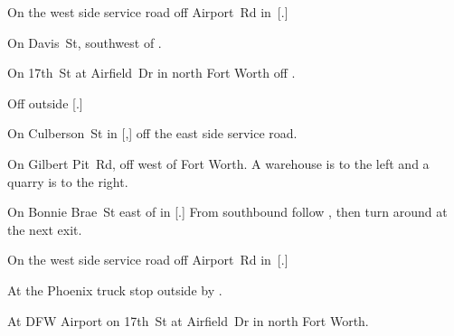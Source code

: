 
\begin{LocationList}

On the west side  service road off  Airport~Rd in~[.]

On  Davis~St, southwest of  .

On 17th~St at Airfield~Dr in north Fort Worth off .

Off  outside [.]

On Culberson~St in [,] off the east side  service road.

On Gilbert Pit~Rd, off  west of Fort Worth.
A warehouse is to the left and a quarry is to the right.

On Bonnie Brae~St east of  in [.]
From  southbound follow , then turn around at the next exit.

On the west side  service road off  Airport~Rd in~[.]

At the Phoenix truck stop outside  by  .

At DFW Airport on 17th~St at Airfield~Dr in north Fort Worth.

\end{LocationList}
